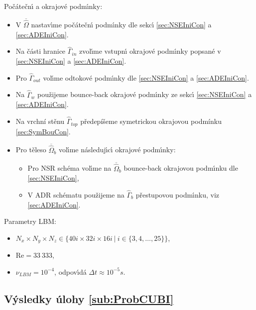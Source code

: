 \begin{tcolorbox}[colframe=blue, title = \'{U}loha \ref{sub:ProbCUBI}]
                Po\v{c}\'{a}te\v{c}n\'{\i} a okrajov\'{e} podm\'{\i}nky:
                \begin{itemize}
                    \item V $\overline{\hat{\Omega}}$ nastav\'{\i}me po\v{c}\'{a}te\v{c}n\'{\i} podm\'{\i}nky dle sekc\'{\i} \ref{sec:NSEIniCon} a \ref{sec:ADEIniCon}.
                    \item Na \v{c}\'{a}sti hranice $\hat{\Gamma}_{in}$ zvol\'{\i}me vstupn\'{\i} okrajov\'{e} podm\'{\i}nky popsan\'{e} v \ref{sec:NSEIniCon} a \ref{sec:ADEIniCon}.
                    \item Pro $\hat{\Gamma}_{out}$ vol\'{\i}me odtokov\'{e} podm\'{\i}nky dle \ref{sec:NSEIniCon} a \ref{sec:ADEIniCon}.
                    \item Na $\hat{\Gamma}_{w}$ pou\v{z}ijeme bounce-back okrajov\'{e} podm\'{\i}nky ze sekc\'{\i} \ref{sec:NSEIniCon} a \ref{sec:ADEIniCon}.
                    \item Na vrchn\'{i} st\v{e}nu $\hat{\Gamma}_{top}$ p\v{r}edep\'{i}\v{s}eme symetrickou okrajovou podm\'{i}nku \ref{sec:SymBouCon}. 
                    \item Pro t\v{e}leso $\overline{\hat{\Omega}}_b$ vol\'{\i}me n\'{a}sleduj\'{\i}c\'{\i} okrajov\'{e} podm\'{\i}nky: \begin{itemize}
                        \item Pro NSR sch\'{e}ma vol\'{\i}me na $\overline{\hat{\Omega}}_b$ bounce-back okrajovou podm\'{\i}nku dle \ref{sec:NSEIniCon},
                        \item V ADR sch\'{e}matu pou\v{z}ijeme na $\hat{\Gamma}_b$ p\v{r}estupovou podm\'{\i}nku, viz \ref{sec:ADEIniCon}.  
                    \end{itemize}
                \end{itemize}
                
                Parametry LBM:
                \begin{itemize}
                    \item $N_x \times N_y \times N_z \in \{ 40i \times 32i \times 16i\ | \ i \in \{ 3,4,\dots,25 \} \} $,
                    \item $\mathrm{Re} = 33 \ 333$,
                    \item $\nu_{LBM} = 10^{-4}$, odpov\'{\i}d\'{a} $\Delta t \approx 10^{-5} s$.
                \end{itemize}
            \end{tcolorbox}

        \subsection{V\'{y}sledky \'{u}lohy \ref{sub:ProbCUBI}}
        

        

